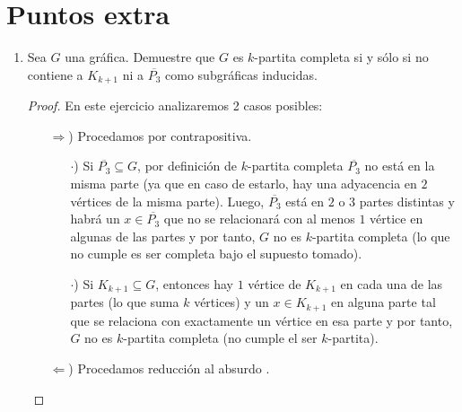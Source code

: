 \documentclass{article}
\begin{document}
  \section*{Puntos extra}

  \begin{enumerate}
    \item Sea $G$ una gr\'afica. Demuestre que $G$ es $k$-partita completa si y
      s\'olo si no contiene a $K_{k+1}$ ni a $\overline{P_3}$ como subgr\'aficas
      inducidas.

      \renewcommand\qedsymbol{QED}
      \begin{proof}
        En este ejercicio analizaremos 2 casos posibles:

        \begin{itemize}
        \item[$\Rightarrow$)] Procedamos por contrapositiva.

          \begin{itemize}
            \item[$\cdot$)] Si $\overline{P_3} \subseteq G$, por definición
              de $k$-partita completa $\overline{P_3}$ no está en la misma
              parte (ya que en caso de estarlo, hay una adyacencia en $2$ vértices
              de la misma parte). Luego, $\overline{P_3}$ está en $2$ o $3$
              partes distintas y habrá un $x \in \overline{P_3}$ que no se
              relacionará con al menos $1$ vértice en algunas de las partes
              y por tanto, $G$ no es $k$-partita completa (lo que no cumple es
              ser completa bajo el supuesto tomado).

            \item[$\cdot$)] Si $K_{k + 1} \subseteq G$, entonces hay $1$ vértice
              de $K_{k + 1}$ en cada una de las partes (lo que suma $k$ v\'ertices) y un
              $x \in K_{k + 1}$ en alguna parte tal que se relaciona con exactamente
              un v\'ertice en esa parte y por tanto, $G$ no es $k$-partita completa
              (no cumple el ser $k$-partita).
          \end{itemize}
        \item[$\Leftarrow$)] Procedamos reducción al absurdo .


\end{itemize}
\end{proof}
\end{enumerate}
\end{document}
